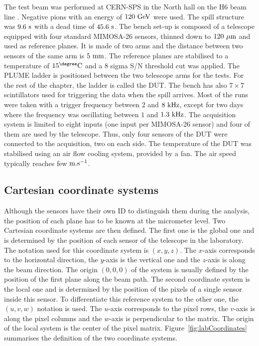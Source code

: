     The test beam was performed at \gls{CERN}-\gls{SPS} in the North hall on the H6 beam line \cite{SPS}.
    Negative pions with an energy of $120~\rm{GeV}$ were used.
    The spill structure was $9.6~\rm{s}$ with a dead time of $45.6~\rm{s}$. 
    The bench set-up is composed of a telescope equipped with four standard \gls{MIMOSA}-26 sensors, thinned down to $120~\rm{\mu m}$ and used as reference planes.
    It is made of two arms and the distance between two sensors of the same arm is $5~\rm{mm}$.
    The reference planes are stabilised to a temperature of $15^{\degree}\rm{C}$ and a 8 sigma S/N threshold cut was applied.
    The \gls{PLUME} ladder is positioned between the two telescope arms for the tests.
    For the rest of the chapter, the ladder is called the \gls{DUT}.
    The bench has also $7 \times 7$ scintillators used for triggering the data when the spill arrives.
    Most of the runs were taken with a trigger frequency between $2$ and $8~\rm{kHz}$, except for two days where the frequency was oscillating between $1$ and $1.3~\rm{kHz}$.
    The acquisition system is limited to eight inputs (one input per \gls{MIMOSA}-26 sensor) and four of them are used by the telescope.
    Thus, only four sensors of the \gls{DUT} were connected to the acquisition, two on each side.
    The temperature of the \gls{DUT} was stabilised using an air flow cooling system, provided by a fan.
    The air speed typically reaches few $\rm{m.s}^{-1}$.

    \subsection{Cartesian coordinate systems}

    Although the sensors have their own ID to distinguish them during the analysis, the position of each plane has to be known at the micrometer level.
    Two Cartesian coordinate systems are then defined.
    The first one is the global one and is determined by the position of each sensor of the telescope in the laboratory.
    The notation used for this coordinate system is $(x,y,z)$.
    The $x$-axis corresponds to the horizontal direction, the $y$-axis is the vertical one and the $z$-axis is along the beam direction.
    The origin $(0,0,0)$ of the system is usually defined by the position of the first plane along the beam path.
    The second coordinate system is the local one and is determined by the position of the pixels of a single sensor inside this sensor.
    To differentiate this reference system to the other one, the $(u,v,w)$ notation is used.
    The $u$-axis corresponds to the pixel rows, the $v$-axis is along the pixel columns and the $w$-axis is perpendicular to the matrix.
    The origin of the local system is the center of the pixel matrix.
    Figure~\ref{fig:labCoordinates} summarises the definition of the two coordinate systems.

